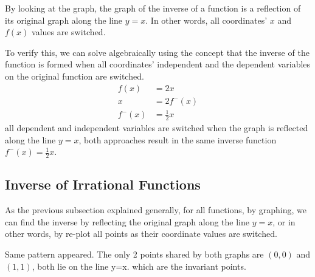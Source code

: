 \documentclass[12pt, titlepage]{article}
\begin{document}
        By looking at the graph, the graph of the inverse of a function is a reflection of its original graph along the line $y=x$. In other words, all coordinates' $x$ and $f(x)$ values are switched.
    
        To verify this, we can solve algebraically using the concept that the inverse of the function is formed when all coordinates' independent and the dependent variables on the original function are switched.
        \begin{align}
            f(x)&=2x\\
            x&=2f^-(x)\\
            f^-(x)&=\frac{1}{2}x
        \end{align}
        all dependent and independent variables are switched when the graph is reflected along the line $y=x$, both approaches result in the same inverse function $f^-(x)=\frac{1}{2}x$.

    \subsection{Inverse of Irrational Functions}
        As the previous subsection explained generally, for all functions, by graphing, we can find the inverse by reflecting the original graph along the line $y=x$, or in other words, by re-plot all points as their coordinate values are switched. 

        \begin{center}
        \end{center}

        Same pattern appeared. The only 2 points shared by both graphs are $(0,0)$ and $(1,1)$, both lie on the line y=x. which are the invariant points.
\end{document}

